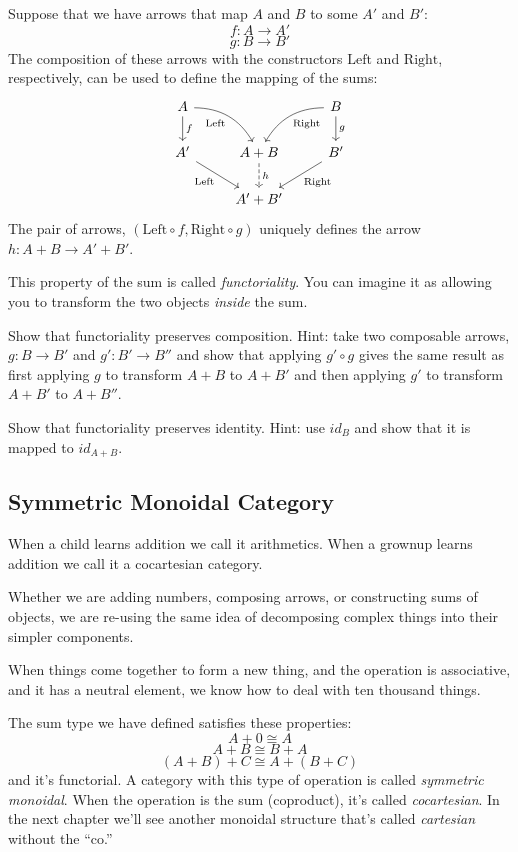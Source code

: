 \documentclass[DaoFP]{subfiles}
\begin{document}
Suppose that we have arrows that map $A$ and $B$ to some $A'$ and $B'$:
\[f \colon A \to A' \]
\[g \colon B \to B'\]
The composition of these arrows with the constructors $\text{Left}$ and $\text{Right}$, respectively, can be used to define the mapping of the sums:
\[
 \begin{tikzcd}
 A
 \arrow[d, "f"]
 \arrow[dr,  bend left, "\text{Left}"']
  && B
 \arrow[d, "g"]
 \arrow[dl, bend right, "\text{Right}"]
 \\
 A'
 \arrow[rd, "\text{Left}"']
&A + B
\arrow[d, dashed, "h"]
& B'
\arrow[ld, "\text{Right}"]
\\
& A' + B'
 \end{tikzcd}
\]
The pair of arrows, $(\text{Left} \circ f, \text{Right} \circ g)$ uniquely defines the arrow $h \colon A + B \to A' + B'$.

This property of the sum is called \emph{functoriality}. You can imagine it as allowing you to transform the two objects \emph{inside} the sum. 

\begin{exercise}
Show that functoriality preserves composition. Hint: take two composable arrows, $g \colon B \to B'$ and $g' \colon B' \to B''$ and show that applying $g' \circ g$ gives the same result as first applying $g$ to transform $A + B$ to $A + B'$ and then applying $g'$ to transform $A + B'$ to $A + B''$.
\end{exercise}

\begin{exercise}
Show that functoriality preserves identity. Hint: use $id_B$ and show that it is mapped to $id_{A+B}$.
\end{exercise}

\subsection{Symmetric Monoidal Category}
When a child learns addition we call it arithmetics. When a grownup learns addition we call it a cocartesian category.

Whether we are adding numbers, composing arrows, or constructing sums of objects, we are re-using the same idea of decomposing complex things into their simpler components.  

When things come together to form a new thing, and the operation is associative, and it has a neutral element, we know how to deal with ten thousand things.

The sum type we have defined satisfies these properties:
\[A + 0 \cong A\]
\[A + B \cong B + A \]
\[(A + B) + C \cong A + (B + C) \]
and it's functorial. A category with this type of operation is called \emph{symmetric monoidal}. When the operation is the sum (coproduct), it's called \emph{cocartesian}. In the next chapter we'll see another monoidal structure that's called \emph{cartesian} without the ``co.''
\end{document}
